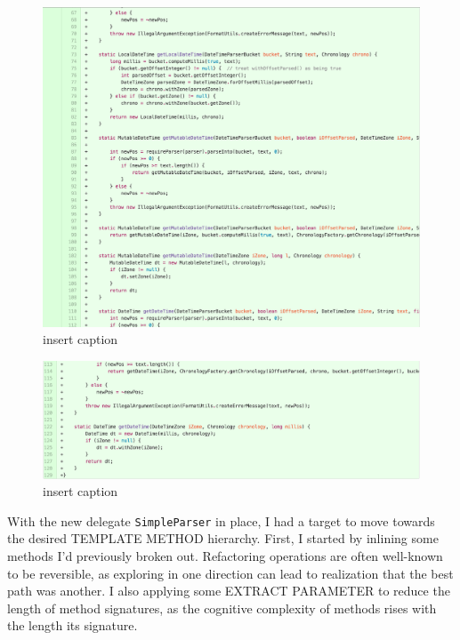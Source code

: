 \begin{figure}[H]
	\centering
	\includegraphics[width=\linewidth]{code74}
	\caption{insert caption}
\end{figure}
\begin{figure}[H]
	\centering
	\includegraphics[width=\linewidth]{code75}
	\caption{insert caption}
\end{figure}

With the new delegate \texttt{SimpleParser} in place, I had a target to move towards the desired TEMPLATE METHOD hierarchy. First, I started by inlining some methods I’d previously broken out. Refactoring operations are often well-known to be reversible, as exploring in one direction can lead to realization that the best path was another. I also applying some EXTRACT PARAMETER to reduce the length of method signatures, as the cognitive complexity of methods rises with the length its signature.

